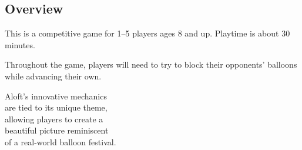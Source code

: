 \documentclass[a5paper, DIV=18, 12pt]{scrartcl}
\begin{document}
\begin{multicols}{2}
\section*{\textcolor{SunriseBlue}{Overview}}
This is a competitive game for 1–5 players ages 8 and up. Playtime is about 30 minutes.
\vspace{1.5ex}

Throughout the game, players will need to try to block their opponents' balloons while advancing their own.  
\vspace{1.5ex}

Aloft's innovative mechanics\\are tied to its unique theme,\\ allowing players to create a\\beautiful picture reminiscent\\of a real-world balloon festival. 
\vfill\null\columnbreak

\end{multicols}
\end{document}
